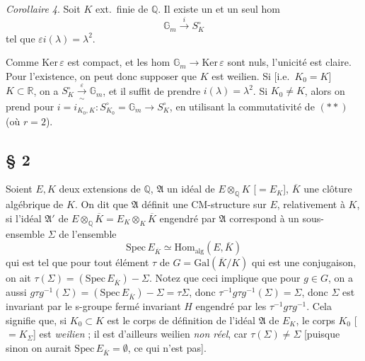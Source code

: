 \documentclass[11pt,a4paper]{article}
\begin{document}
\emph{Corollaire 4}. Soit $K$ ext.\ finie de $\mathbb{Q}$. Il existe un et un
seul hom
\[
  \mathbb{G}_{m} \xrightarrow{\;i\;} S^{\circ}_{K}
\]
tel que $\varepsilon i(\lambda) = \lambda^{2}$.

Comme $\mathrm{Ker}\,\varepsilon$ est compact, et les hom $\mathbb{G}_{m} \to
\mathrm{Ker}\,\varepsilon$ sont nuls, l'unicité est claire. Pour
l'existence, on peut donc supposer que $K$ est weilien. Si \ill{} [i.e.\
$K_{0} = K$] $K \subset \mathbb{R}$, on a $S^{\circ}_{K}
\xrightarrow[\sim]{\;\varepsilon\;} \mathbb{G}_{m}$, et il suffit de prendre
$i(\lambda) = \lambda^{2}$. Si $K_{0} \neq K$, alors on prend pour $i =
i_{K_{0},K} : S^{\circ}_{K_{0}} = \mathbb{G}_{m} \to S^{\circ}_{K}$, en
utilisant la commutativité de $(**)$ (où $r = 2$).

\subsection*{§ 2}


Soient $E, K$ deux extensions de $\mathbb{Q}$, \struck{$\Sigma$}
$\mathfrak{A}$ un idéal de $E \otimes_{\mathbb{Q}} K$ [$= E_{K}$],
$\overline{K}$ une clôture algébrique de $K$. On dit que $\mathfrak{A}$
définit une CM-structure sur $E$, relativement à $K$, si l'idéal
$\mathfrak{A}'$ de $E \otimes_{\mathbb{Q}} \overline{K} = E_{K}
\otimes_{K} \overline{K}$ engendré par $\mathfrak{A}$ correspond à un
sous-ensemble $\Sigma$ de l'ensemble \struck{\ill{}}
\[
  \mathrm{Spec}\, E_{\overline{K}} \simeq \mathrm{Hom}_{\mathrm{alg}}(E,
  \overline{K})
\]
qui est tel que pour tout élément $\tau$ de $G = \mathrm{Gal}(\overline{K}/K)$
qui est une conjugaison, on ait $\tau(\Sigma) = (\mathrm{Spec}\,
E_{\overline{K}}) - \Sigma$. Notez que ceci implique que pour $g \in G$, on a
aussi $g \tau g^{-1}(\Sigma) = (\mathrm{Spec}\, E_{\overline{K}}) - \Sigma =
\tau \Sigma$, donc $\tau^{-1} g \tau g^{-1}(\Sigma) = \Sigma$, donc $\Sigma$
est invariant \struck{\ill{}} par le s-groupe \struck{\ill{}} fermé invariant
$H$ engendré par les $\tau^{-1} g \tau g^{-1}$. Cela signifie que, si $K_{0}
\subset K$ est le corps de définition de l'idéal $\mathfrak{A}$ de $E_{K}$,
le corps $K_{0}$ [$= K_{\Sigma}$] est \emph{weilien} ; \struck{et} il est
d'ailleurs weilien \emph{non réel}, car $\tau(\Sigma) \neq \Sigma$ [puisque
sinon on aurait $\mathrm{Spec}\, E_{\overline{K}} = \emptyset$, ce qui n'est
pas]. \struck{Alors le groupe de \ill{} $\overline{\mathbb{Q}}$.}
\end{document}
